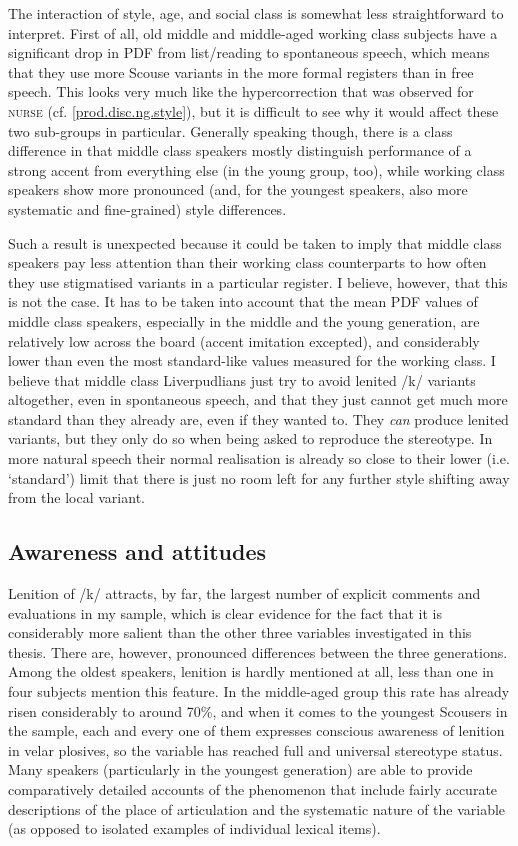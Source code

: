 The interaction of style, age, and social class is somewhat less straightforward to interpret.
First of all, old middle and middle-aged working class subjects have a significant drop in PDF from list/reading to spontaneous speech, which means that they use more Scouse variants in the more formal registers than in free speech.
This looks very much like the hypercorrection that was observed for \textsc{nurse} (cf. \ref{prod.disc.ng.style}), but it is difficult to see why it would affect these two sub-groups in particular.
Generally speaking though, there is a class difference in that middle class speakers mostly distinguish performance of a strong accent from everything else (in the young group, too), while working class speakers show more pronounced (and, for the youngest speakers, also more systematic and fine-grained) style differences.

Such a result is unexpected because it could be taken to imply that middle class speakers pay less attention than their working class counterparts to how often they use stigmatised variants in a particular register.
I believe, however, that this is not the case.
It has to be taken into account that the mean PDF values of middle class speakers, especially in the middle and the young generation, are relatively low across the board (accent imitation excepted), and considerably lower than even the most standard-like values measured for the working class.
I believe that middle class Liverpudlians just try to avoid lenited /k/ variants altogether, even in spontaneous speech, and that they just cannot get much more standard than they already are, even if they wanted to.
They \emph{can} produce lenited variants, but they only do so when being asked to reproduce the stereotype.
In more natural speech their normal realisation is already so close to their lower (i.e. `standard') limit that there is just no room left for any further style shifting away from the local variant.

\subsection{Awareness and attitudes}
\label{prod.disc.k.aware}

Lenition of /k/ attracts, by far, the largest number of explicit comments and evaluations in my sample, which is clear evidence for the fact that it is considerably more salient than the other three variables investigated in this thesis.
There are, however, pronounced differences between the three generations.
Among the oldest speakers, lenition is hardly mentioned at all, less than one in four subjects mention this feature.
In the middle-aged group this rate has already risen considerably to around 70\%, and when it comes to the youngest Scousers in the sample, each and every one of them expresses conscious awareness of lenition in velar plosives, so the variable has reached full and universal stereotype status.
Many speakers (particularly in the youngest generation) are able to provide comparatively detailed accounts of the phenomenon that include fairly accurate descriptions of the place of articulation and the systematic nature of the variable (as opposed to isolated examples of individual lexical items).

